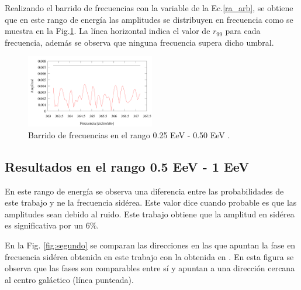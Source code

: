 Realizando el barrido de frecuencias con la variable de la Ec.\ref{ra_arb}, se obtiene que en este rango de energía las amplitudes se  distribuyen en frecuencia como se muestra en la Fig.\ref{fig:primer_barrido}. La línea horizontal indica el valor de $r_{99}$ para cada frecuencia, además se observa que ninguna frecuencia supera dicho umbral.

\begin{figure}[H]
    \begin{small}
        \begin{center}
            \includegraphics[width=0.5\textwidth]{plot_bin_1_barrido.pdf}
        \end{center}
        \caption{Barrido de frecuencias en el  rango 0.25 EeV - 0.50 EeV .}
        \label{fig:primer_barrido}
    \end{small}
\end{figure}



\subsection*{Resultados en el rango 0.5 EeV - 1 EeV}
En este rango de energía se observa una diferencia entre las probabilidades de este trabajo y \cite{Aab_2020}  ne la frecuencia sidérea. Este valor dice cuando probable es que las amplitudes sean debido al ruido. Este trabajo obtiene que la amplitud en sidérea es significativa por un  $6\%$.  

En la Fig. \ref{fig:segundo} se comparan las direcciones en las que apuntan la fase en frecuencia sidérea obtenida en este trabajo con la obtenida en \cite{Aab_2020}. En esta figura se observa que las fases son comparables entre sí y apuntan a una dirección cercana al centro galáctico (línea punteada).



